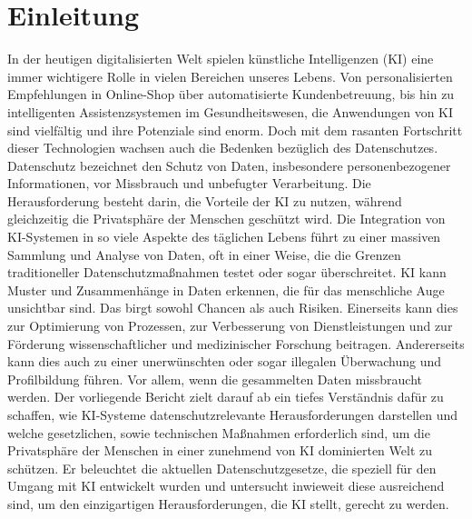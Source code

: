 \chapter{Einleitung}
In der heutigen digitalisierten Welt spielen künstliche Intelligenzen (KI) eine
immer wichtigere Rolle in vielen Bereichen unseres Lebens. Von personalisierten
Empfehlungen in Online-Shop über automatisierte Kundenbetreuung, bis hin zu
intelligenten Assistenzsystemen im Gesundheitswesen, die Anwendungen von KI sind
vielfältig und ihre Potenziale sind enorm. Doch mit dem rasanten Fortschritt
dieser Technologien wachsen auch die Bedenken bezüglich des Datenschutzes.
Datenschutz bezeichnet den Schutz von Daten, insbesondere personenbezogener
Informationen, vor Missbrauch und unbefugter Verarbeitung. Die Herausforderung
besteht darin, die Vorteile der KI zu nutzen, während gleichzeitig die
Privatsphäre der Menschen geschützt wird. Die Integration von KI-Systemen in so
viele Aspekte des täglichen Lebens führt zu einer massiven Sammlung und Analyse
von Daten, oft in einer Weise, die die Grenzen traditioneller
Datenschutzmaßnahmen testet oder sogar überschreitet. KI kann Muster und
Zusammenhänge in Daten erkennen, die für das menschliche Auge unsichtbar sind.
Das birgt sowohl Chancen als auch Risiken. Einerseits kann dies zur Optimierung
von Prozessen, zur Verbesserung von Dienstleistungen und zur Förderung
wissenschaftlicher und medizinischer Forschung beitragen. Andererseits kann dies
auch zu einer unerwünschten oder sogar illegalen Überwachung und Profilbildung
führen. Vor allem, wenn die gesammelten Daten missbraucht werden. Der
vorliegende Bericht zielt darauf ab ein tiefes Verständnis dafür zu schaffen,
wie KI-Systeme datenschutzrelevante Herausforderungen darstellen und welche
gesetzlichen, sowie technischen Maßnahmen erforderlich sind, um die Privatsphäre
der Menschen in einer zunehmend von KI dominierten Welt zu schützen. Er
beleuchtet die aktuellen Datenschutzgesetze, die speziell für den Umgang mit KI
entwickelt wurden und untersucht inwieweit diese ausreichend sind, um den
einzigartigen Herausforderungen, die KI stellt, gerecht zu werden. 
